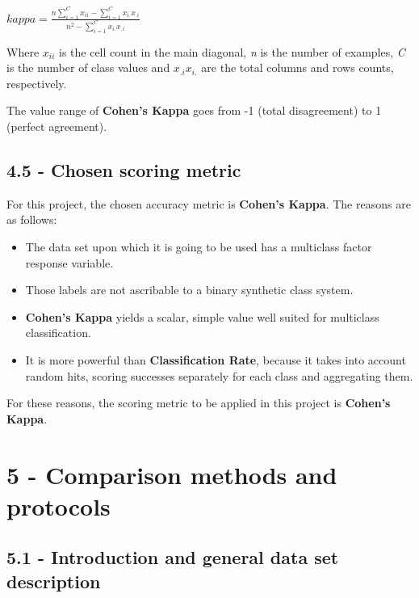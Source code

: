 \documentclass[]{article}
\begin{document}
\(kappa = \frac{n \sum_{i=1}^C x_{ii} - \sum_{i=1}^C x_{i.}x_{.i}}{n^2 - \sum_{i=1}^C x_{i.}x_{.i}}\)

Where \(x_{ii}\) is the cell count in the main diagonal, \emph{n} is the
number of examples, \emph{C} is the number of class values and
\(x_{.i}x_{i.}\) are the total columns and rows counts, respectively.

The value range of \textbf{Cohen's Kappa} goes from -1 (total
disagreement) to 1 (perfect agreement).

\subsection{4.5 - Chosen scoring metric}\label{chosen-scoring-metric}

For this project, the chosen accuracy metric is \textbf{Cohen's Kappa}.
The reasons are as follows:

\begin{itemize}
\itemsep1pt\parskip0pt
\item
  The data set upon which it is going to be used has a multiclass factor
  response variable.\\
\item
  Those labels are not ascribable to a binary synthetic class system.\\
\item
  \textbf{Cohen's Kappa} yields a scalar, simple value well suited for
  multiclass classification.\\
\item
  It is more powerful than \textbf{Classification Rate}, because it
  takes into account random hits, scoring successes separately for each
  class and aggregating them.
\end{itemize}

For these reasons, the scoring metric to be applied in this project is
\textbf{Cohen's Kappa}.

\section{5 - Comparison methods and
protocols}\label{comparison-methods-and-protocols}

\subsection{5.1 - Introduction and general data set
description}\label{introduction-and-general-data-set-description}
\end{document}
